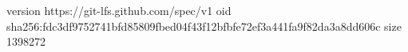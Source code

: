 version https://git-lfs.github.com/spec/v1
oid sha256:fdc3df9752741bfd85809fbed04f43f12bfbfe72ef3a441fa9f82da3a8dd606c
size 1398272
